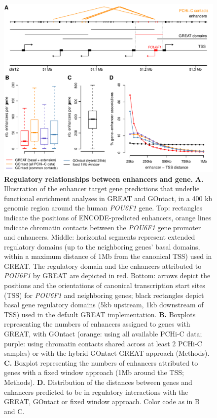\begin{figure}[hbt!]
 \centering
 \includegraphics[width=1\textwidth, page=1] {figures/GOntact/Figure1.pdf}
 \caption[Regulatory relationships between enhancers and gene.]{
 \textbf{Regulatory relationships between enhancers and gene.}
 \textbf{A.} Illustration of the enhancer target gene predictions that underlie functional enrichment analyses in GREAT and GOntact, in a 400 kb genomic region around the human \textit{POU6F1} gene. Top: rectangles indicate the positions of ENCODE-predicted enhancers, orange lines indicate chromatin contacts between the \textit{POU6F1} gene promoter and enhancers. Middle: horizontal segments represent extended regulatory domains (up to the neighboring genes’ basal domains, within a maximum distance of 1Mb from the canonical TSS) used in GREAT. The regulatory domain and the enhancers attributed to \textit{POU6F1} by GREAT are depicted in red. Bottom: arrows depict the positions and the orientations of canonical transcription start sites (TSS) for \textit{POU6F1} and neighboring genes; black rectangles depict basal gene regulatory domains (5kb upstream, 1kb downstream of TSS) used in the default GREAT implementation. 
 \textbf{B.} Boxplots representing the numbers of enhancers assigned to genes with GREAT, with GOntact (orange: using all available PCHi-C data; purple: using chromatin contacts shared across at least 2 PCHi-C samples) or with the hybrid GOntact-GREAT approach (Methods). 
 \textbf{C.} Boxplot representing the numbers of enhancers attributed to genes with a fixed window approach (1Mb around the TSS; Methods). 
 \textbf{D.} Distribution of the distances between genes and enhancers predicted to be in regulatory interactions with the GREAT, GOntact or fixed window approach. Color code as in B and C.
 \\
 }
 \label{fig:GOntact-fig1}
\end{figure} 

